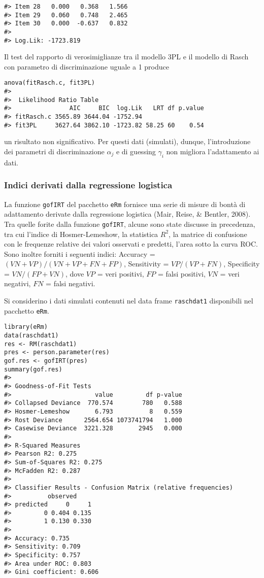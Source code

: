 \begin{exmp}
\begin{lstlisting}
#> Item 28   0.000   0.368   1.566
#> Item 29   0.060   0.748   2.465
#> Item 30   0.000  -0.637   0.832
#> 
#> Log.Lik: -1723.819
\end{lstlisting}
Il test del rapporto di verosimiglianze tra il modello 3PL e il modello di Rasch con parametro di discriminazione uguale a 1 produce
\begin{lstlisting}
anova(fitRasch.c, fit3PL)
#> 
#>  Likelihood Ratio Table
#>                AIC     BIC  log.Lik   LRT df p.value
#> fitRasch.c 3565.89 3644.04 -1752.94                 
#> fit3PL     3627.64 3862.10 -1723.82 58.25 60    0.54
\end{lstlisting}
un risultato non significativo.  Per questi dati (simulati), dunque, l'introduzione dei parametri di discriminazione $\alpha_j$ e di guessing $\gamma_i$ non migliora l'adattamento ai dati.
\end{exmp}

\subsubsection{Indici derivati dalla regressione logistica}

La funzione {\tt gofIRT} del pacchetto {\tt eRm} fornisce una serie di
misure di bontà di adattamento derivate dalla regressione logistica
(Mair, Reise, \& Bentler, 2008). Tra quelle forite
dalla funzione {\tt gofIRT}, alcune sono state discusse in precedenza,
tra cui l'indice di Hosmer-Lemeshow, la statistica $R^2$, la matrice
di confusione con le frequenze relative dei valori osservati e
predetti, l'area sotto la curva ROC.  
Sono inoltre forniti i seguenti indici: Accuracy = $(VN+VP)/(VN+VP+FN+FP)$, 
Sensitivity = $VP/(VP+FN)$, Specificity = $VN/(FP+VN)$,
dove $VP$ = veri positivi, 
$FP$ = falsi positivi, 
$VN$ = veri negativi,
$FN$ = falsi negativi.

\begin{exmp}

Si considerino i dati simulati contenuti nel data frame {\tt raschdat1} disponibili nel pacchetto {\tt eRm}.  

\begin{lstlisting}
library(eRm)
data(raschdat1)
res <- RM(raschdat1)
pres <- person.parameter(res)
gof.res <- gofIRT(pres)
summary(gof.res)
#> 
#> Goodness-of-Fit Tests
#>                       value         df p-value
#> Collapsed Deviance  770.574        780   0.588
#> Hosmer-Lemeshow       6.793          8   0.559
#> Rost Deviance      2564.654 1073741794   1.000
#> Casewise Deviance  3221.328       2945   0.000
#> 
#> R-Squared Measures
#> Pearson R2: 0.275
#> Sum-of-Squares R2: 0.275
#> McFadden R2: 0.287
#> 
#> Classifier Results - Confusion Matrix (relative frequencies)
#>          observed
#> predicted     0     1
#>         0 0.404 0.135
#>         1 0.130 0.330
#> 
#> Accuracy: 0.735
#> Sensitivity: 0.709
#> Specificity: 0.757
#> Area under ROC: 0.803
#> Gini coefficient: 0.606
\end{lstlisting}
\end{exmp}





